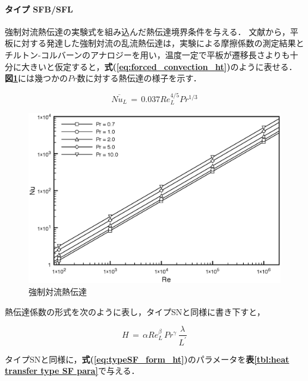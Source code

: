 %
\paragraph{タイプ SFB/SFL}
強制対流熱伝達の実験式を組み込んだ熱伝達境界条件を与える．
文献\cite{shouji:95:Dennetsu}から，平板に対する発達した強制対流の乱流熱伝達は，実験による摩擦係数の測定結果とチルトン-コルバーンのアナロジーを用い，温度一定で平板が遷移長さよりも十分に大きいと仮定すると，\textbf{式(\ref{eq:forced_convection_ht})}のように表せる．\textbf{図\ref{fig:forced_heat_transfer}}には幾つかの$Pr$数に対する熱伝達の様子を示す．

\begin{equation}
\overline{Nu_L} \,=\, 0.037Re_L^{4/5}Pr^{1/3}
\label{eq:forced_convection_ht}
\end{equation}

\begin{figure}[htdp]
\begin{center}
\includegraphics[width=12cm,clip]{HeatTransfer_Forced.eps}
\caption{強制対流熱伝達\cite{shouji:95:Dennetsu}}
\label{fig:forced_heat_transfer}
\end{center}
\end{figure}

\noindent 熱伝達係数の形式を次のように表し，タイプSNと同様に書き下すと，

\begin{equation}
H \,=\, \alpha Re_L^\beta \, Pr^\gamma \, \frac{\lambda}{L^\prime}
\label{eq:typeSF_form_ht}
\end{equation}

タイプSNと同様に，\textbf{式(\ref{eq:typeSF_form_ht})}のパラメータを\textbf{表\ref{tbl:heat transfer type SF para}}で与える．

